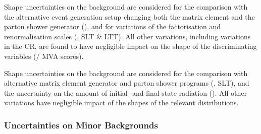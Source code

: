 Shape uncertainties on the \ZHF background are considered for the comparison
with the alternative event generation setup changing both the matrix element and
the parton shower generator (\hadhad), and for variations of the factorisation
and renormalisation scales (\hadhad, \lephad SLT \& LTT). All other variations,
including variations in the \ZHF CR, are found to have negligible impact on the
shape of the discriminating variables (\mll / MVA scores).

Shape uncertainties on the \ttbar background are considered for the comparison
with alternative matrix element generator and parton shower programs (\hadhad,
\lephad SLT), and the uncertainty on the amount of initial- and final-state
radiation (\hadhad). All other variations have negligible impact of the shapes
of the relevant distributions.


\subsubsection{Uncertainties on Minor Backgrounds}

